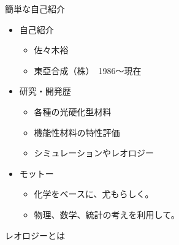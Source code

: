 \begin{frame}

\begin{block}{簡単な自己紹介}

\begin{itemize}

\item
  自己紹介

  \begin{itemize}
  
  \item
    佐々木裕
  \item
    東亞合成（株）　1986～現在
  \end{itemize}
\item
  研究・開発歴

  \begin{itemize}
  
  \item
    各種の光硬化型材料
  \item
    機能性材料の特性評価
  \item
    シミュレーションやレオロジー
  \end{itemize}
\item
  モットー

  \begin{itemize}
  
  \item
    化学をベースに、尤もらしく。\\
  \item
    物理、数学、統計の考えを利用して。
  \end{itemize}
\end{itemize}

\end{block}

\end{frame}

\begin{frame}

\begin{block}{レオロジーとは}

\end{block}

\end{frame}

